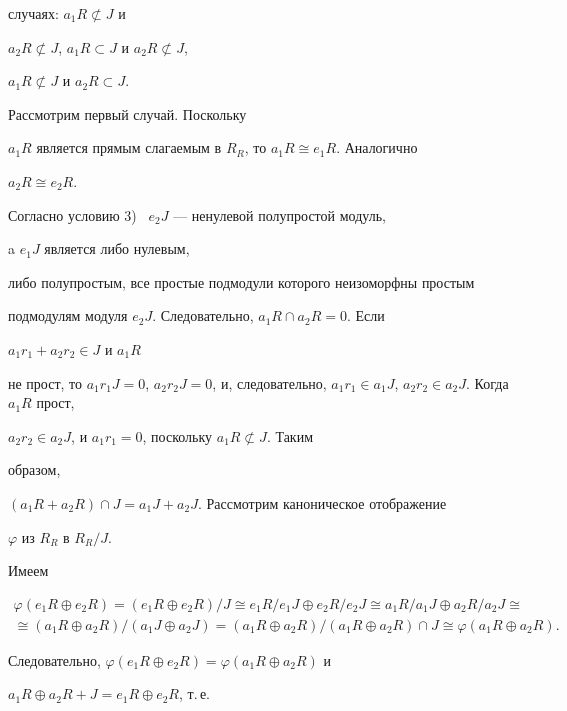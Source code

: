случаях: $a_1R\not\subset J$ и  


$a_2R\not\subset J$, $a_1R\subset J$ и $a_2R\not\subset J$, 


$a_1R\not\subset J$ и $a_2R\subset J$. 


 


Рассмотрим первый случай. Поскольку  


$a_1R$ является прямым слагаемым в $R_R$, то $a_1R\cong e_1R$. Аналогично 


$a_2R\cong e_2R$. 


Согласно условию 3) \ $e_2J$ --- ненулевой полупростой модуль,


a $e_1J$ является либо нулевым, 


либо полупростым, все простые подмодули которого неизоморфны простым  


подмодулям модуля $e_2J$. Следовательно, $a_1R\cap a_2R=0$. Если 


$a_1r_1+a_2r_2\in J$ и $a_1R$ 


не прост, то $a_1r_1J=0$, $a_2r_2J=0$, и, следовательно, $a_1r_1\in 


a_1J$, $a_2r_2\in a_2J$. Когда $a_1R$ прост,  


$a_2r_2\in a_2J$, и $a_1r_1=0$, поскольку $a_1R\not\subset J$. Таким 


образом,  


$(a_1R+a_2R)\cap J=a_1J+a_2J$. Рассмотрим каноническое отображение 


$\varphi$ из $R_R$ в $R_R/J$.  


Имеем 


\begin{multline*} 


\varphi(e_1R\oplus e_2R)=(e_1R\oplus e_2R)/J\cong 


e_1R/e_1J\oplus e_2R/e_2J\cong a_1R/a_1J\oplus a_2R/a_2J\cong \\ 


% 


\cong(a_1R\oplus a_2R)/(a_1J\oplus a_2J)= 


(a_1R\oplus a_2R)/(a_1R\oplus a_2R)\cap J\cong 


\varphi(a_1R\oplus a_2R). 


\end{multline*} 


Следовательно, $\varphi(e_1R\oplus e_2R)=\varphi(a_1R\oplus a_2R)$ и 


$a_1R\oplus a_2R+J=e_1R\oplus e_2R$, т.\,е. 


